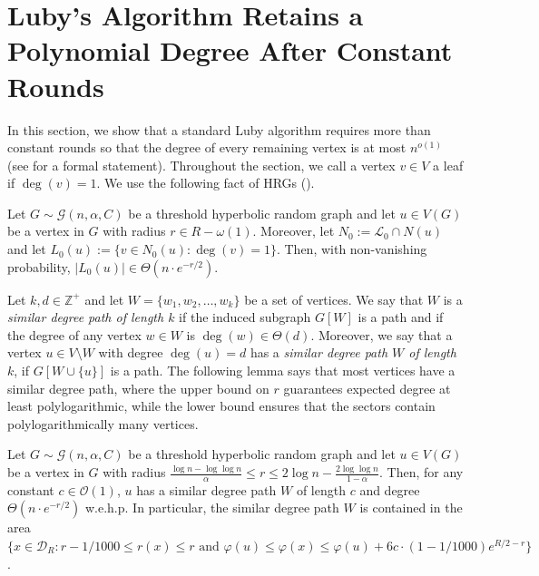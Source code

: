 \documentclass[letterpaper,11pt]{article}
\newcommand{\wehp}{w.e.h.p.\xspace}
\newcommand{\disk}{\ensuremath{\mathcal D_R}\xspace}
\newcommand{\1}{\mathbb I}
\newcommand{\hrg}{\mathcal{G}(n, \alpha, C)}
\newcommand{\bigO}{\mathcal{O}}
\newcommand{\Layer}[1]{\mathcal{L}_{#1}}
\begin{document}
\printbibliography 

\newpage

\appendix

\section{Luby's Algorithm Retains a Polynomial Degree After Constant Rounds}\label{sec:hrg-aint-nuthin-to-fuck-with}
%
In this section, we show that a standard Luby algorithm requires more than constant rounds so that the degree of every remaining vertex is at most $n^{o(1)}$ (see  for a formal statement). Throughout the section, we call a vertex $v \in V$ a leaf if $\deg(v) = 1$. We use the following fact of HRGs (\cite[Lemma 10]{mr-soda-26}).
%
\begin{lemma}\label{lem:leaves}
Let $G\sim\hrg$ be a threshold hyperbolic random graph and let $u \in V(G)$ be a vertex in $G$ with radius $r \in R - \omega(1)$. Moreover, let $N_0 := \Layer{0} \cap N(u)$ and let $L_0(u) := \{v \in N_0(u) : \deg(v) = 1 \}$. Then, with non-vanishing probability, $|L_0(u)| \in \Theta(n\cdot e^{-r/2})$.
\end{lemma}
%
Let $k, d \in \mathbb{Z}^+$ and let $W = \{w_1, w_2, \dots, w_{k}\}$ be a set of vertices. We say that $W$ is a \emph{similar degree path of length $k$} if the induced subgraph $G[W]$ is a path and if the degree of any vertex $w \in W$ is $\deg(w) \in \Theta(d)$. Moreover, we say that a vertex $u \in V\setminus W$ with degree $\deg(u) = d$ has a \emph{similar degree path $W$ of length $k$}, if $G[W\cup \{u\}]$ is a path. The following lemma says that most vertices have a similar degree path, where the upper bound on $r$ guarantees expected degree at least polylogarithmic, while the lower bound ensures that the sectors contain polylogarithmically many vertices.
%
\begin{lemma}\label{lem:similar-degree-path}
%
Let $G\sim\hrg$ be a threshold hyperbolic random graph and let $u \in V(G)$ be a vertex in $G$ with radius $\frac{\log n - \log\log n}{\alpha} \leq r \leq 2\log n - \frac{2\log\log n}{1-\alpha}$. Then, for any constant $c \in \bigO(1)$, $u$ has a similar degree path $W$ of length $c$ and degree $\Theta(n\cdot e^{-r/2})$ \wehp In particular, the similar degree path $W$ is contained in the area $\{x \in \disk : r - 1/1000 \leq r(x) \leq r  \text{ and } \varphi(u) \leq \varphi(x) \leq \varphi(u) + 6c\cdot (1 - 1/1000)e^{R/2-r}\}$.
\end{lemma}
\end{document}
